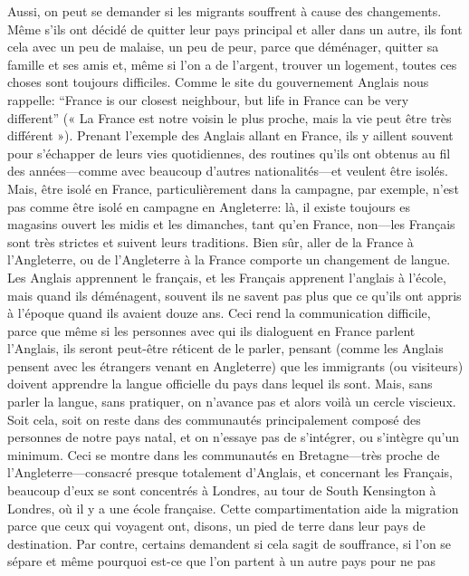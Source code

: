\documentclass[12pt]{article}
\begin{document}
Aussi, on peut se demander si les migrants souffrent à cause des
changements. Même s'ils ont décidé de quitter leur pays principal et
aller dans un autre, ils font cela avec un peu de malaise, un peu de
peur, parce que déménager, quitter sa famille et ses amis et, même si
l'on a de l'argent, trouver un logement, toutes ces choses sont
toujours difficiles. Comme le site du gouvernement Anglais nous
rappelle: ``France is our closest neighbour, but life in France can be
very different'' (« La France est notre voisin le plus proche, mais la
vie peut être très différent »). Prenant l'exemple des Anglais allant
en France, ils y aillent souvent pour s'échapper de leurs vies
quotidiennes, des routines qu'ils ont obtenus au fil des
années---comme avec beaucoup d'autres nationalités---et veulent être
isolés. Mais, être isolé en France, particulièrement dans la campagne,
par exemple, n'est pas comme être isolé en campagne en Angleterre: là,
il existe toujours es magasins ouvert les midis et les dimanches, tant
qu'en France, non---les Français sont très strictes et suivent leurs
traditions.  Bien sûr, aller de la France à l'Angleterre, ou de
l'Angleterre à la France comporte un changement de langue. Les Anglais
apprennent le français, et les Français apprenent l'anglais à l'école,
mais quand ils déménagent, souvent ils ne savent pas plus que ce
qu'ils ont appris à l'époque quand ils avaient douze ans. Ceci rend la
communication difficile, parce que même si les personnes avec qui ils
dialoguent en France parlent l'Anglais, ils seront peut-être réticent
de le parler, pensant (comme les Anglais pensent avec les étrangers
venant en Angleterre) que les immigrants (ou visiteurs) doivent
apprendre la langue officielle du pays dans lequel ils sont. Mais,
sans parler la langue, sans pratiquer, on n'avance pas et alors voilà
un cercle viscieux. Soit cela, soit on reste dans des communautés
principalement composé des personnes de notre pays natal, et on
n'essaye pas de s'intégrer, ou s'intègre qu'un minimum. Ceci se montre
dans les communautés en Bretagne---très proche de
l'Angleterre---consacré presque totalement d'Anglais, et concernant
les Français, beaucoup d'eux se sont concentrés à Londres, au tour de
South Kensington à Londres, où il y a une école française. Cette
compartimentation aide la migration parce que ceux qui voyagent ont,
disons, un pied de terre dans leur pays de destination. Par contre,
certains demandent si cela sagit de souffrance, si l'on se sépare et
même pourquoi est-ce que l'on partent à un autre pays pour ne pas
\end{document}
